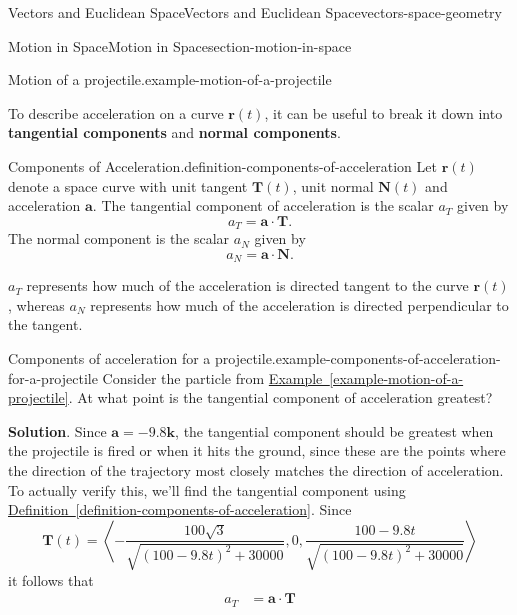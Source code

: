 \documentclass[oneside,10pt,]{book}
\newcommand{\terminology}[1]{\textbf{#1}}
\numberwithin{equation}{section}
\newcommand{\vv}[1]{\mathbf{#1}}
\newcommand{\dotprod}[1]{\left\langle #1 \right\rangle}
\begin{document}
\begin{chapterptx}{Vectors and Euclidean Space}{}{Vectors and Euclidean Space}{}{}{vectors-space-geometry}
\begin{sectionptx}{Motion in Space}{}{Motion in Space}{}{}{section-motion-in-space}
\begin{example}{Motion of a projectile.}{example-motion-of-a-projectile}
\end{example}
\hypertarget{p-1317}{}%
To describe acceleration on a curve \(\vv{r}(t)\), it can be useful to break it down into \terminology{tangential components} and \terminology{normal components}.%
\begin{definition}{Components of Acceleration.}{definition-components-of-acceleration}%
\hypertarget{p-1318}{}%
Let \(\vv{r}(t)\) denote a space curve with unit tangent \(\vv{T}(t)\), unit normal \(\vv{N}(t)\) and acceleration \(\vv{a}\). The tangential component of acceleration is the scalar \(a_{T}\) given by%
%
\begin{equation*}
a_{T} = \vv{a}\cdot\vv{T}.
\end{equation*}
\hypertarget{p-1319}{}%
The normal component is the scalar \(a_{N}\) given by%
%
\begin{equation*}
a_{N} = \vv{a}\cdot\vv{N}.
\end{equation*}
\end{definition}
\hypertarget{p-1320}{}%
\(a_{T}\) represents how much of the acceleration is directed tangent to the curve \(\vv{r}(t)\), whereas \(a_{N}\) represents how much of the acceleration is directed perpendicular to the tangent.%
\begin{example}{Components of acceleration for a projectile.}{example-components-of-acceleration-for-a-projectile}%
\hypertarget{p-1321}{}%
Consider the particle from \hyperref[example-motion-of-a-projectile]{Example~\ref{example-motion-of-a-projectile}}. At what point is the tangential component of acceleration greatest?%
\par\smallskip%
\noindent\textbf{Solution}.\hypertarget{solution-210}{}\quad%
\hypertarget{p-1322}{}%
Since \(\vv{a} = -9.8\vv{k}\), the tangential component should be greatest when the projectile is fired or when it hits the ground, since these are the points where the direction of the trajectory most closely matches the direction of acceleration. To actually verify this, we'll find the tangential component using \hyperref[definition-components-of-acceleration]{Definition~\ref{definition-components-of-acceleration}}. Since%
%
\begin{equation*}
\vv{T}(t) = \dotprod{-\frac{100\sqrt{3}}{\sqrt{(100-9.8t)^{2}+30000}}, 0, \frac{100 - 9.8t}{\sqrt{(100-9.8t)^{2}+30000}}}
\end{equation*}
\hypertarget{p-1323}{}%
it follows that%
%
\begin{align*}
a_{T} & = \vv{a}\cdot\vv{T} \\

\end{align*}
\end{example}
\end{sectionptx}
\end{chapterptx}
\end{document}
